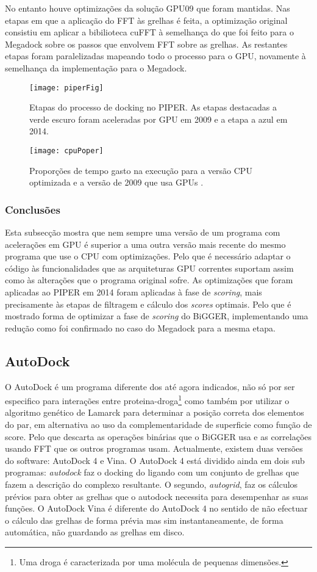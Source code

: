  No entanto houve optimizações da solução GPU09 que foram mantidas. Nas etapas em que a aplicação do FFT às grelhas é feita, a optimização original consistiu em aplicar a bibilioteca cuFFT à semelhança do que foi feito para o Megadock sobre os passos que envolvem FFT sobre as grelhas. As restantes etapas foram paralelizadas mapeando todo o processo para o GPU, novamente à semelhança da implementação para o Megadock.
    \begin{figure}[ht]
  \centering
    {\texttt{[image: piperFig]}}
  \caption{Etapas do processo de docking no PIPER. As etapas destacadas a verde escuro foram aceleradas por GPU em 2009 e a etapa a azul em 2014. \cite{piper2014gpu} }
  \label{piperGPU}
\end{figure}

    \begin{figure}[ht]
  \centering
    {\texttt{[image: cpuPoper]}}
  \caption{Proporções de tempo gasto na execução para a versão CPU optimizada e a versão de 2009 que usa GPUs\cite{piper2014gpu} . }
  \label{propPiper}
\end{figure}
\subsubsection{Conclusões}
Esta subsecção mostra que nem sempre uma versão de um programa com acelerações em GPU é superior a uma outra versão mais recente do mesmo programa que use o CPU com optimizações. Pelo que é necessário adaptar o código às funcionalidades que as arquiteturas GPU correntes suportam assim como às alterações que o programa original sofre. As optimizações que foram aplicadas ao PIPER em 2014 foram aplicadas à fase de \textit{scoring}, mais precisamente às etapas de filtragem e cálculo dos \textit{scores} optimais. Pelo que é mostrado forma de optimizar a fase de \textit{scoring} do BiGGER, implementando uma redução como foi confirmado no caso do Megadock para a mesma etapa.
\subsection {AutoDock}
O AutoDock \cite{autoDock} é um programa diferente dos até agora indicados, não só por ser especifico para interações entre proteina-droga\footnote[10]{Uma droga é caracterizada  por uma molécula de pequenas dimensões.} como também por utilizar o algoritmo genético de Lamarck para determinar a posição correta dos elementos do par, em alternativa ao uso da complementaridade de superficie como função de score. Pelo que descarta as operações binárias que o BiGGER usa e as correlações usando FFT que os outros programas usam.
Actualmente, existem duas versões do software: AutoDock 4 e Vina\cite{autoDockVina}. O AutoDock 4 está dividido ainda em dois sub programas: \textit{autodock} faz o docking do ligando com um conjunto de grelhas que fazem a descrição do complexo resultante. O segundo, \textit{autogrid}, faz os cálculos prévios para obter as grelhas que o autodock necessita para desempenhar as suas funções.  
O AutoDock Vina é diferente do AutoDock 4 no sentido de não efectuar o cálculo das grelhas de forma prévia mas sim instantaneamente, de forma automática, não guardando as grelhas em disco.
